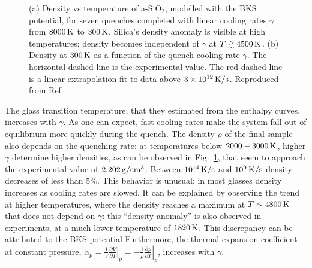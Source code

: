 \begin{figure}[!tb]
    \centering
    \hfill
    \caption{
    (a) Density vs temperature of a-SiO$_2$, modelled with the BKS potential, for seven quenches completed with linear cooling rates $\gamma$ from $8000\,\mathrm{K}$ to $300\,\mathrm{K}$. Silica's density anomaly is visible at high temperatures; density becomes independent of $\gamma$ at $T \gtrsim 4500\,\mathrm{K}$. 
    (b) Density at $300\,\mathrm{K}$ as a function of the quench cooling rate $\gamma$. The horizontal dashed line is the experimental value. The red dashed line is a linear extrapolation fit to data above $3\times 10^{12}\,\mathrm{K/s}$. 
    Reproduced from Ref.~\cite{Lane2015}}
    \label{fig:silica-bks-density}
\end{figure}

The glass transition temperature, that they estimated from the enthalpy curves, increases with $\gamma$. As one can expect, fast cooling rates make the system fall out of equilibrium more quickly during the quench. 
The density $\rho$ of the final sample also depends on the quenching rate: at temperatures below $2000-3000\,\mathrm{K}$, higher $\gamma$ determine higher densities, as can be observed in Fig.~\ref{fig:silica-bks-density}, that seem to approach the experimental value of $2.202\,\mathrm{g/cm^3}$. Between $10^{14}\,\mathrm{K/s}$ and $10^{9}\,\mathrm{K/s}$ density decreases of less than $5\%$. 
This behavior is unusual: in most glasses density increases as cooling rates are slowed.  It can be explained by observing the trend at higher temperatures, where the density reaches a maximum at $T\sim 4800\,\mathrm{K}$ that does not depend on $\gamma$: this ``density anomaly'' is also observed in experiments, at a much lower temperature of $1820\,\mathrm{K}$. This discrepancy can be attributed to the BKS potential   
Furthermore, the thermal expansion coefficient at constant pressure, $\alpha_p = \frac{1}{V} \left.\frac{\partial V}{\partial T}\right|_p = -\frac{1}{\rho} \left.\frac{\partial \rho}{\partial T}\right|_p$, increases with $\gamma$.

